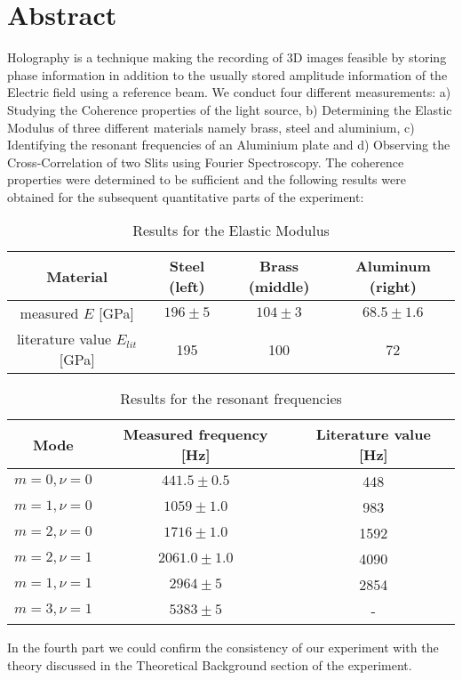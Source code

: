 \section*{Abstract}

Holography is a technique making the recording of 3D images feasible by storing phase information in addition to the usually stored amplitude information of the Electric field using a reference beam. We conduct four different measurements: a) Studying the Coherence properties of the light source, b) Determining the Elastic Modulus of three different materials namely brass, steel and aluminium, c) Identifying the resonant frequencies of an Aluminium plate and d) Observing the Cross-Correlation of two Slits using Fourier Spectroscopy. The coherence properties were determined to be sufficient and the following results were obtained for the subsequent quantitative parts of the experiment:

\begin{table}[h!]
	\centering
	\begin{tabular}{c|c|c|c}
		Material							& Steel (left)	& Brass (middle)	& Aluminum (right)\\ \hline\hline
		measured $E$ [GPa]			& $196\pm5$	& 	$104\pm3$		& $68.5\pm1.6$			\\ \hline
		literature value \cite{staats} $E_{lit}$ [GPa]	& 195			& 100				& 72
	\end{tabular}
	\caption{Results for the Elastic Modulus}
\end{table}

\begin{table}[h!]
	\centering
	\begin{tabular}{c|c|c}
		Mode 		& Measured frequency [Hz] 	& Literature value [Hz]\\ \hline\hline
		$m=0,\nu=0$	& $441.5\pm0.5$					& 448	\\ \hline
		$m=1,\nu=0$	& $1059\pm1.0$				& 983	\\ \hline
		$m=2,\nu=0$	& $1716\pm1.0$				& 1592	\\ \hline
		$m=2,\nu=1$	& $2061.0\pm1.0$				& 4090	\\ \hline
		$m=1,\nu=1$	& $2964\pm5$				& 2854 \\ \hline
		$m=3,\nu=1$	& $5383\pm5$				&-
	\end{tabular}
	\caption{Results for the resonant frequencies}
\end{table}

In the fourth part we could confirm the consistency of our experiment with the theory discussed in the Theoretical Background section of the experiment.